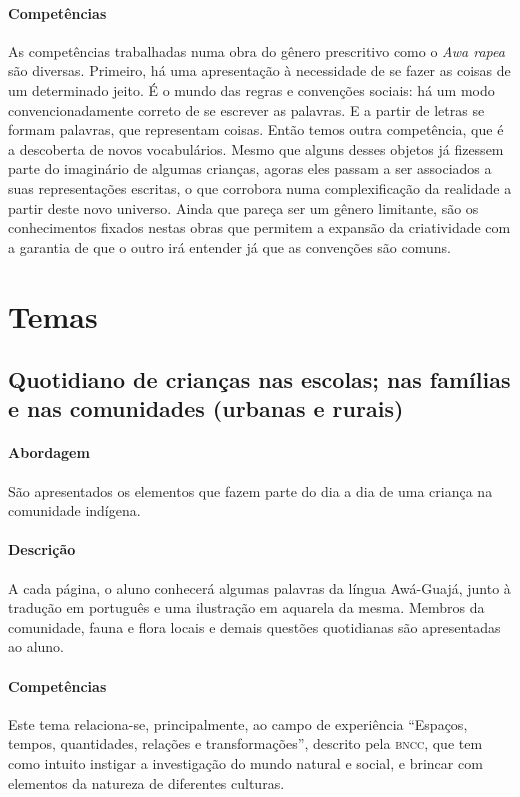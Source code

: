 \documentclass[11pt]{extarticle}
\begin{document}
\paragraph{Competências} 
As competências trabalhadas numa obra do gênero prescritivo como o 
\emph{Awa rapea} são diversas. 
Primeiro, há uma apresentação à necessidade de se fazer as coisas de um 
determinado jeito. É o mundo das regras e convenções sociais: há um modo 
convencionadamente correto de se escrever as palavras. E a partir de letras 
se formam palavras, que representam coisas. Então temos outra competência, 
que é a descoberta de novos vocabulários. Mesmo que alguns desses objetos já 
fizessem parte do imaginário de algumas crianças, agoras eles passam
a ser associados a suas representações escritas, o que corrobora numa complexificação
da realidade a partir deste novo universo. Ainda que pareça ser um gênero
limitante, são os conhecimentos fixados nestas obras que permitem a expansão
da criatividade com a garantia de que o outro irá entender já que as convenções são comuns.

\section{Temas}

\subsection{Quotidiano de crianças nas escolas; nas famílias e nas comunidades (urbanas e rurais)}

\paragraph{Abordagem} 
São apresentados os elementos que fazem parte do dia a dia de uma criança na comunidade indígena.
\paragraph{Descrição} 
A cada página, o aluno conhecerá algumas palavras da língua Awá-Guajá, junto à tradução em português
e uma ilustração em aquarela da mesma. Membros da comunidade, fauna e flora locais e demais questões
quotidianas são apresentadas ao aluno.
\paragraph{Competências} 
Este tema relaciona-se, principalmente, ao campo de experiência ``Espaços, tempos, quantidades, relações e transformações'',
descrito pela \textsc{bncc}, que tem como intuito instigar a investigação
do mundo natural e social, e brincar com elementos da natureza de diferentes culturas.
\end{document}
